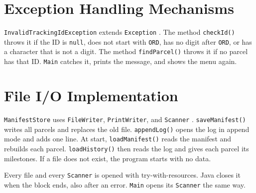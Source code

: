 \section{Exception Handling Mechanisms}
\texttt{InvalidTrackingIdException} extends \texttt{Exception} \cite{ref1}. The method
\texttt{checkId()} throws it if the ID is \texttt{null}, does not start with
\texttt{ORD}, has no digit after \texttt{ORD}, or has a character that is not a
digit. The method
\texttt{findParcel()} throws it if no parcel has that ID. \texttt{Main} catches
it, prints the message, and shows the menu again.

\section{File I/O Implementation}
\texttt{ManifestStore} uses \texttt{FileWriter}, \texttt{PrintWriter}, and
\texttt{Scanner} \cite{ref1}. \texttt{saveManifest()} writes all parcels and replaces the
old file. \texttt{appendLog()} opens the log in append mode and adds one line.
At start, \texttt{loadManifest()} reads the manifest and rebuilds each parcel.
\texttt{loadHistory()} then reads the log and gives each parcel its
milestones. If a file does not exist, the program starts with no data.

Every file and every \texttt{Scanner} is opened with try-with-resources. Java
closes it when the block ends, also after an error. \texttt{Main} opens its
\texttt{Scanner} the same way.
